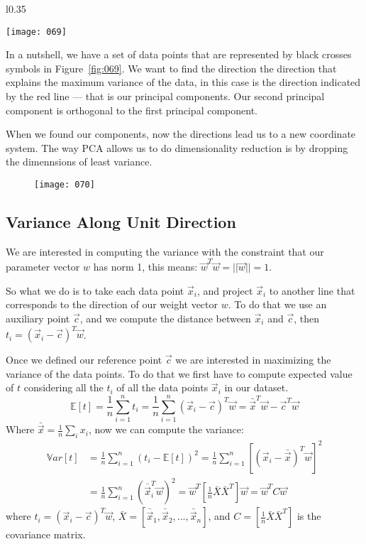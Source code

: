 \begin{wrapfigure}{l}{0.35\textwidth}
    \begin{center}
        \texttt{[image: 069]}
        \caption{}
    \end{center}
    \label{fig:069}
\end{wrapfigure}
In a nutshell, we have a set of data points that are represented by black crosses symbols in Figure~\ref{fig:069}. We want to find the direction the direction that explains the maximum variance of the data, in this case is the direction indicated by the red line --- that is our principal components. Our second principal component is orthogonal to the first principal component.

When we found our components, now the directions lead us to a new coordinate system. The way PCA allows us to do dimensionality reduction is by dropping the dimennsions of least variance.
\begin{figure}[h!]
    \centering
    \texttt{[image: 070]}
    \caption{}
    \label{fig:070}
\end{figure}

\subsection{Variance Along Unit Direction}
We are interested in computing the variance with the constraint that our parameter vector \(w\) has norm 1, this means: \(\vec{w}^T\vec{w} = ||\vec{w}|| = 1\). 

So what we do is to take each data point \(\vec{x}_i\), and project \(\vec{x}_i\) to another line that corresponds to the direction of our weight vector \(w\). To do that we use an auxiliary point \(\vec{c}\), and we compute the distance between \(\vec{x}_i\) and \(\vec{c}\), then \(t_i = (\vec{x}_i - \vec{c})^T \vec{w}\).

Once we defined our reference point \(\vec{c}\) we are interested in maximizing the variance of the data points. To do that we first have to compute expected value of \(t\) considering all the \(t_i\) of all the data points \(\vec{x}_i\) in our dataset.
\begin{equation}
    \mathbb{E}\left[t\right] = \frac 1 n \sum_{i=1}^n t_i = \frac 1 n \sum_{i=1}^n (\vec{x}_i - \vec{c})^T \vec{w} = \bar{\vec{x}}^T \vec{w} - \vec{c}^T \vec{w}
\end{equation}
Where \(\bar{\vec{x}} = \frac 1 n \sum_i x_i\), now we can compute the variance:
\begin{align}
    \mathbb{V}ar\left[t\right] &= \frac 1 n \sum_{i=1}^n \left(t_i - \mathbb{E}[t]\right)^2 = \frac 1 n \sum_{i=1}^n \left[(\vec{x}_i - \bar{\vec{x}})^T \vec{w}\right]^2\\
    & = \frac 1 n \sum_{i=1}^n \left(\bar{\vec{x}}_i^T \vec{w}\right)^2 = \vec{w}^T \left[ \frac 1 n \bar{X}\bar{X}^T \right] \vec{w} = \vec{w}^T C \vec{w}
\end{align}
where \(t_i = (\vec{x}_i - \vec{c})^T \vec{w}\), \(\bar{X} = [\bar{\vec{x}}_1, \bar{\vec{x}}_2, ..., \bar{\vec{x}}_n]\), and \(C = \left[ \frac 1 n \bar{X}\bar{X}^T \right]\) is the covariance matrix.

